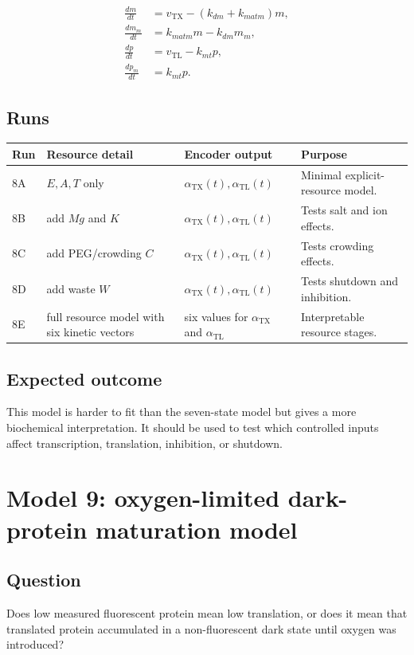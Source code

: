 \documentclass[11pt]{article}
\newcommand{\TX}{\mathrm{TX}}
\newcommand{\TL}{\mathrm{TL}}
\begin{document}
\begin{align}
    \frac{dm}{dt} &= v_{\TX}-(k_{dm}+k_{matm})m, \\
    \frac{dm_m}{dt} &= k_{matm}m-k_{dm}m_m, \\
    \frac{dp}{dt} &= v_{\TL}-k_{mt}p, \\
    \frac{dp_m}{dt} &= k_{mt}p.
\end{align}

\subsection{Runs}

\begin{center}
\begin{tabularx}{\textwidth}{lllX}
\toprule
Run & Resource detail & Encoder output & Purpose \\
\midrule
8A & $E,A,T$ only & $\alpha_{\TX}(t),\alpha_{\TL}(t)$ & Minimal explicit-resource model. \\
8B & add $Mg$ and $K$ & $\alpha_{\TX}(t),\alpha_{\TL}(t)$ & Tests salt and ion effects. \\
8C & add PEG/crowding $C$ & $\alpha_{\TX}(t),\alpha_{\TL}(t)$ & Tests crowding effects. \\
8D & add waste $W$ & $\alpha_{\TX}(t),\alpha_{\TL}(t)$ & Tests shutdown and inhibition. \\
8E & full resource model with six kinetic vectors & six values for $\alpha_{\TX}$ and $\alpha_{\TL}$ & Interpretable resource stages. \\
\bottomrule
\end{tabularx}
\end{center}

\subsection{Expected outcome}

This model is harder to fit than the seven-state model but gives a more biochemical interpretation. It should be used to test which controlled inputs affect transcription, translation, inhibition, or shutdown.

\section{Model 9: oxygen-limited dark-protein maturation model}

\subsection{Question}
Does low measured fluorescent protein mean low translation, or does it mean that translated protein accumulated in a non-fluorescent dark state until oxygen was introduced?
\end{document}
